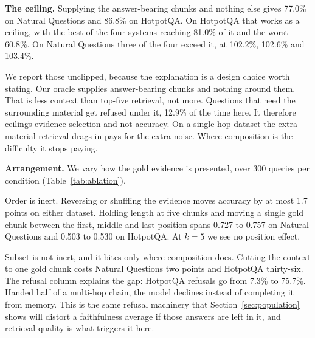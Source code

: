 \documentclass[11pt]{article}
\begin{document}
\textbf{The ceiling.} Supplying the answer-bearing chunks and nothing else gives 77.0\% on Natural Questions and 86.8\% on HotpotQA. On HotpotQA that works as a ceiling, with the best of the four systems reaching 81.0\% of it and the worst 60.8\%. On Natural Questions three of the four exceed it, at 102.2\%, 102.6\% and 103.4\%.

We report those unclipped, because the explanation is a design choice worth stating. Our oracle supplies answer-bearing chunks and nothing around them. That is less context than top-five retrieval, not more. Questions that need the surrounding material get refused under it, 12.9\% of the time here. It therefore ceilings evidence selection and not accuracy. On a single-hop dataset the extra material retrieval drags in pays for the extra noise. Where composition is the difficulty it stops paying.

\textbf{Arrangement.} We vary how the gold evidence is presented, over 300 queries per condition (Table~\ref{tab:ablation}).

Order is inert. Reversing or shuffling the evidence moves accuracy by at most 1.7 points on either dataset. Holding length at five chunks and moving a single gold chunk between the first, middle and last position spans 0.727 to 0.757 on Natural Questions and 0.503 to 0.530 on HotpotQA. At $k = 5$ we see no position effect.

Subset is not inert, and it bites only where composition does. Cutting the context to one gold chunk costs Natural Questions two points and HotpotQA thirty-six. The refusal column explains the gap: HotpotQA refusals go from 7.3\% to 75.7\%. Handed half of a multi-hop chain, the model declines instead of completing it from memory. This is the same refusal machinery that Section~\ref{sec:population} shows will distort a faithfulness average if those answers are left in it, and retrieval quality is what triggers it here.
\end{document}
